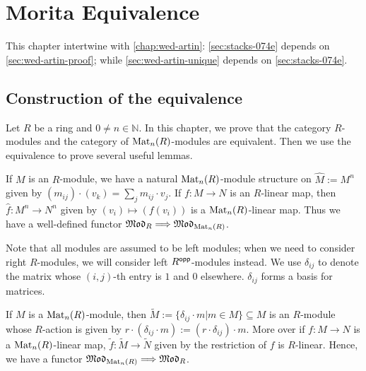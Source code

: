 \chapter{Morita Equivalence}\label{chap:morita}

This chapter intertwine with \cref{chap:wed-artin}: \cref{sec:stacks-074e} depends on \cref{sec:wed-artin-proof}; while \cref{sec:wed-artin-unique} depends on \cref{sec:stacks-074e}.

\section{Construction of the equivalence}\label{sec:morita-construction}

Let $R$ be a ring and $0 \ne n\in \mathbb{N}$. In this chapter, we prove that the category $R$-modules and the category of $\operatorname{Mat}_{n}(R)$-modules are equivalent. Then we use the equivalence to prove several useful lemmas.

\begin{construction}\label{con:morita-eqv-functor0}
  \leanok
  If $M$ is an $R$-module, we have a natural $\operatorname{Mat}_{n}(R)$-module structure on $\widehat{M}:=M^{n}$ given by $(m_{ij})\cdot (v_{k})=\sum_{j}m_{ij}\cdot v_{j}$.
  If $f : M \to N$ is an $R$-linear map, then $\widehat{f} : M^{n}\to N^{n}$ given by $(v_{i}) \mapsto (f(v_{i}))$ is a $\operatorname{Mat}_{n}(R)$-linear map. Thus we have a well-defined functor $\operatorname{\mathfrak{Mod}}_{R} \Longrightarrow \operatorname{\mathfrak{Mod}}_{\operatorname{Mat}_{n}(R)}$.
\end{construction}

\begin{remark}
Note that all modules are assumed to be left modules; when we need to consider right $R$-modules, we will consider left $R^{\mathsf{opp}}$-modules instead. We use $\delta_{ij}$ to denote the matrix whose $(i,j)$-th entry is $1$ and $0$ elsewhere. $\delta_{ij}$ forms a basis for matrices.
\end{remark}

\begin{construction}\label{con:morita-eqv-functor1}
  \leanok
  If $M$ is a $\operatorname{Mat}_{n}(R)$-module, then $\widetilde{M} := \{\delta_{ij}\cdot m | m \in M\} \subseteq M$ is an $R$-module whose $R$-action is given by $r \cdot (\delta_{ij}\cdot m) := (r\cdot \delta_{ij})\cdot m$. More over if $f : M \to N$ is a $\operatorname{Mat}_{n}(R)$-linear map, $\widetilde{f} : \widetilde{M} \to \widetilde{N}$ given by the restriction of $f$ is $R$-linear. Hence, we have a functor $\operatorname{\mathfrak{Mod}}_{\operatorname{Mat}_{n}(R)}\Longrightarrow \operatorname{\mathfrak{Mod}}_{R}$.
\end{construction}

